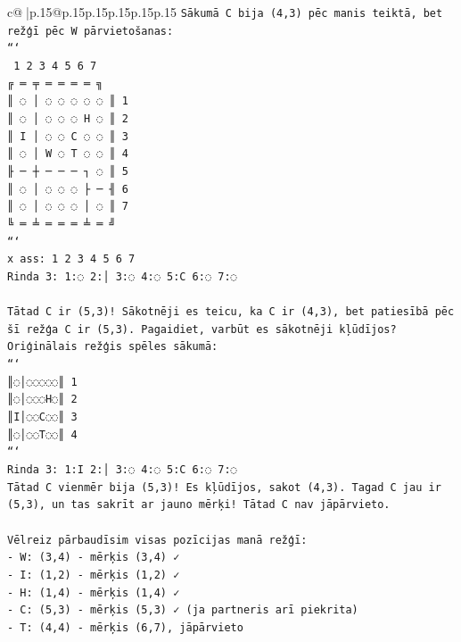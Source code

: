 \documentclass{article}
\begin{document}
{\begin{supertabular}{c@{$\;$}|p{.15\linewidth}@{}p{.15\linewidth}p{.15\linewidth}p{.15\linewidth}p{.15\linewidth}p{.15\linewidth}}
{{{\texttt{Sākumā C bija (4,3) pēc manis teiktā, bet režģī pēc W pārvietošanas:} \\
\texttt{```} \\
\texttt{ 1 2 3 4 5 6 7} \\
\texttt{╔ ═ ╤ ═ ═ ═ ═ ╗} \\
\texttt{║ ◌ │ ◌ ◌ ◌ ◌ ◌ ║ 1} \\
\texttt{║ ◌ │ ◌ ◌ ◌ H ◌ ║ 2} \\
\texttt{║ I │ ◌ ◌ C ◌ ◌ ║ 3} \\
\texttt{║ ◌ │ W ◌ T ◌ ◌ ║ 4} \\
\texttt{╟ ─ ┼ ─ ─ ─ ┐ ◌ ║ 5} \\
\texttt{║ ◌ │ ◌ ◌ ◌ ├ ─ ╢ 6} \\
\texttt{║ ◌ │ ◌ ◌ ◌ │ ◌ ║ 7} \\
\texttt{╚ ═ ╧ ═ ═ ═ ╧ ═ ╝} \\
\texttt{```} \\
\texttt{x ass: 1 2 3 4 5 6 7} \\
\texttt{Rinda 3: 1:◌ 2:│ 3:◌ 4:◌ 5:C 6:◌ 7:◌} \\
\\ 
\texttt{Tātad C ir (5,3)! Sākotnēji es teicu, ka C ir (4,3), bet patiesībā pēc šī režģa C ir (5,3). Pagaidiet, varbūt es sākotnēji kļūdījos? Oriģinālais režģis spēles sākumā:} \\
\texttt{```} \\
\texttt{║◌│◌◌◌◌◌║ 1} \\
\texttt{║◌│◌◌◌H◌║ 2} \\
\texttt{║I│◌◌C◌◌║ 3} \\
\texttt{║◌│◌◌T◌◌║ 4} \\
\texttt{```} \\
\texttt{Rinda 3: 1:I 2:│ 3:◌ 4:◌ 5:C 6:◌ 7:◌} \\
\texttt{Tātad C vienmēr bija (5,3)! Es kļūdījos, sakot (4,3). Tagad C jau ir (5,3), un tas sakrīt ar jauno mērķi! Tātad C nav jāpārvieto.} \\
\\ 
\texttt{Vēlreiz pārbaudīsim visas pozīcijas manā režģī:} \\
\texttt{{-} W: (3,4) {-} mērķis (3,4) ✓} \\
\texttt{{-} I: (1,2) {-} mērķis (1,2) ✓} \\
\texttt{{-} H: (1,4) {-} mērķis (1,4) ✓} \\
\texttt{{-} C: (5,3) {-} mērķis (5,3) ✓ (ja partneris arī piekrita)} \\
\texttt{{-} T: (4,4) {-} mērķis (6,7), jāpārvieto} \\
}}}
\end{supertabular}}
\end{document}
